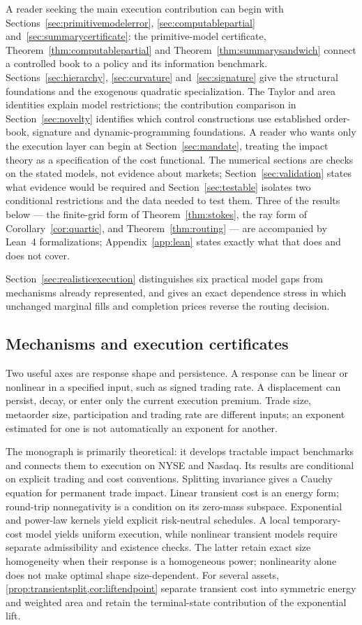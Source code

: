 \documentclass[11pt]{article}
\numberwithin{equation}{section}
\theoremstyle{definition}
\theoremstyle{remark}
\theoremstyle{definition}
\begin{document}
A reader seeking the main execution contribution can begin with
Sections~\ref{sec:primitivemodelerror}, \ref{sec:computablepartial}
and~\ref{sec:summarycertificate}: the primitive-model certificate,
Theorem~\ref{thm:computablepartial} and Theorem~\ref{thm:summarysandwich}
connect a controlled book to a policy and its information benchmark.
Sections~\ref{sec:hierarchy}, \ref{sec:curvature} and~\ref{sec:signature}
give the structural foundations and the exogenous quadratic specialization.
The Taylor and area identities explain model restrictions; the contribution
comparison in Section~\ref{sec:novelty} identifies which control constructions
use established order-book, signature and dynamic-programming foundations. A reader who wants only the execution layer
can begin at Section~\ref{sec:mandate}, treating the impact theory as a
specification of the cost functional. The numerical sections are checks on the
stated models, not evidence about markets; Section~\ref{sec:validation} states
what evidence would be required and Section~\ref{sec:testable} isolates two
conditional restrictions and the data needed to test them.
Three of the results below --- the finite-grid form of
Theorem~\ref{thm:stokes}, the ray form of Corollary~\ref{cor:quartic}, and
Theorem~\ref{thm:routing} --- are accompanied by Lean~4 formalizations;
Appendix~\ref{app:lean} states exactly what that does and does not cover.

Section~\ref{sec:realisticexecution} distinguishes six practical model gaps from mechanisms already represented, and gives an exact dependence stress in which unchanged marginal fills and completion prices reverse the routing decision.

\subsection{Mechanisms and execution certificates}

Two useful axes are response shape and persistence. A response can be linear or
nonlinear in a specified input, such as signed trading rate. A displacement can
persist, decay, or enter only the current execution premium. Trade size,
metaorder size, participation and trading rate are different inputs; an exponent
estimated for one is not automatically an exponent for another.

The monograph is primarily theoretical: it develops tractable impact benchmarks and
connects them to execution on NYSE and Nasdaq. Its results are conditional on explicit trading and cost
conventions. Splitting invariance gives a Cauchy equation for permanent trade
impact. Linear transient cost is an energy form; round-trip nonnegativity is a
condition on its zero-mass subspace. Exponential and power-law kernels yield
explicit risk-neutral schedules. A local temporary-cost model yields uniform
execution, while nonlinear transient models require separate admissibility and
existence checks. The latter retain exact size homogeneity when their response is
a homogeneous power; nonlinearity alone does not make optimal shape size-dependent.
For several assets, \cref{prop:transientsplit,cor:liftendpoint} separate
transient cost into symmetric energy and weighted area and retain the
terminal-state contribution of the exponential lift.
\end{document}
